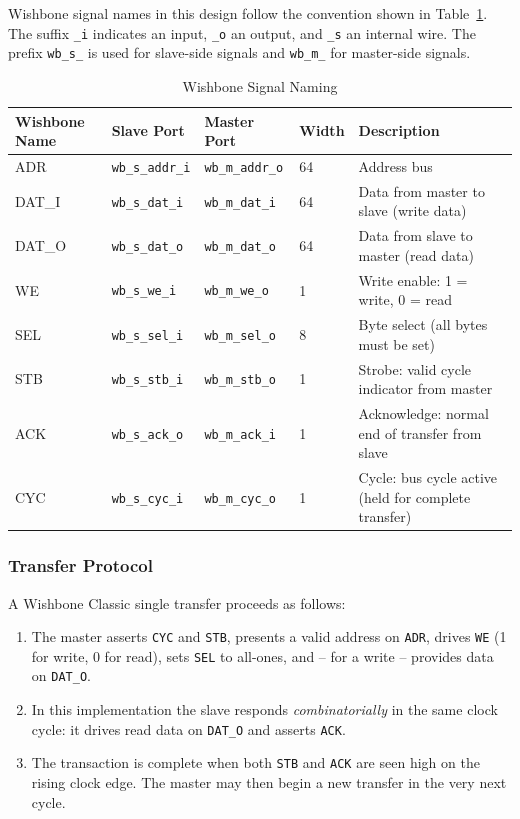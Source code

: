 Wishbone signal names in this design follow the convention shown in
Table~\ref{tab:asBusConcept02}.
The suffix \texttt{\_i} indicates an input, \texttt{\_o} an output,
and \texttt{\_s} an internal wire.
The prefix \texttt{wb\_s\_} is used for slave-side signals and
\texttt{wb\_m\_} for master-side signals.

\begin{table}[H]
\caption{Wishbone Signal Naming}
\label{tab:asBusConcept02}
\centering
\begin{tabularx}{\textwidth}{|l |l |l |l |X|}
  \hline
  Wishbone Name & Slave Port & Master Port & Width & Description \\
  \hline
  \hline
  ADR    & \texttt{wb\_s\_addr\_i} & \texttt{wb\_m\_addr\_o} & 64 & Address bus \\
  \hline
  DAT\_I & \texttt{wb\_s\_dat\_i}  & \texttt{wb\_m\_dat\_i}  & 64 & Data from master to slave (write data) \\
  \hline
  DAT\_O & \texttt{wb\_s\_dat\_o}  & \texttt{wb\_m\_dat\_o}  & 64 & Data from slave to master (read data) \\
  \hline
  WE     & \texttt{wb\_s\_we\_i}   & \texttt{wb\_m\_we\_o}   & 1  & Write enable: 1 = write, 0 = read \\
  \hline
  SEL    & \texttt{wb\_s\_sel\_i}  & \texttt{wb\_m\_sel\_o}  & 8  & Byte select (all bytes must be set) \\
  \hline
  STB    & \texttt{wb\_s\_stb\_i}  & \texttt{wb\_m\_stb\_o}  & 1  & Strobe: valid cycle indicator from master \\
  \hline
  ACK    & \texttt{wb\_s\_ack\_o}  & \texttt{wb\_m\_ack\_i}  & 1  & Acknowledge: normal end of transfer from slave \\
  \hline
  CYC    & \texttt{wb\_s\_cyc\_i}  & \texttt{wb\_m\_cyc\_o}  & 1  & Cycle: bus cycle active (held for complete transfer) \\
  \hline
\end{tabularx}
\end{table}

\subsubsection{Transfer Protocol}

A Wishbone Classic single transfer proceeds as follows:

\begin{enumerate}
  \item The master asserts \texttt{CYC} and \texttt{STB}, presents a valid
    address on \texttt{ADR}, drives \texttt{WE} (1 for write, 0 for read),
    sets \texttt{SEL} to all-ones, and -- for a write -- provides data on
    \texttt{DAT\_O}.
  \item In this implementation the slave responds \emph{combinatorially} in the
    same clock cycle: it drives read data on \texttt{DAT\_O} and asserts
    \texttt{ACK}.
  \item The transaction is complete when both \texttt{STB} and \texttt{ACK}
    are seen high on the rising clock edge.
    The master may then begin a new transfer in the very next cycle.
\end{enumerate}

